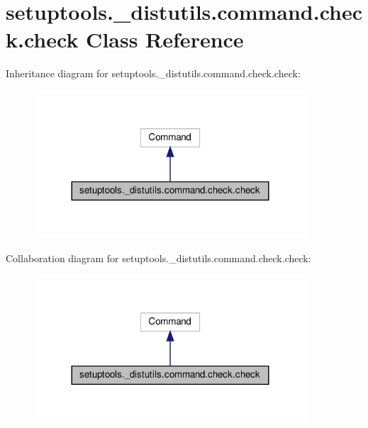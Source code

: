 \hypertarget{classsetuptools_1_1__distutils_1_1command_1_1check_1_1check}{}\section{setuptools.\+\_\+distutils.\+command.\+check.\+check Class Reference}
\label{classsetuptools_1_1__distutils_1_1command_1_1check_1_1check}


Inheritance diagram for setuptools.\+\_\+distutils.\+command.\+check.\+check\+:
\nopagebreak
\begin{figure}[H]
\begin{center}
\leavevmode
\includegraphics[width=288pt]{classsetuptools_1_1__distutils_1_1command_1_1check_1_1check__inherit__graph}
\end{center}
\end{figure}


Collaboration diagram for setuptools.\+\_\+distutils.\+command.\+check.\+check\+:
\nopagebreak
\begin{figure}[H]
\begin{center}
\leavevmode
\includegraphics[width=288pt]{classsetuptools_1_1__distutils_1_1command_1_1check_1_1check__coll__graph}
\end{center}
\end{figure}
